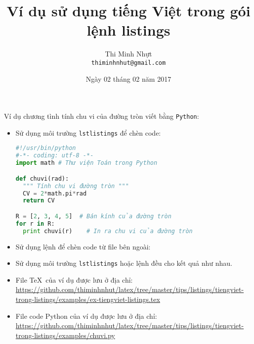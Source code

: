 \documentclass[12pt, a4paper]{article}
\title{\bfseries Ví dụ sử dụng tiếng Việt trong gói lệnh listings}
\author{Thi Minh Nhựt \bigskip \\ \tt{thiminhnhut@gmail.com}}
\date{Ngày 02 tháng 02 năm 2017}
\begin{document}
\maketitle

Ví dụ chương tình tính chu vi của đường tròn viết bằng \verb|Python|:
\begin{itemize}
  \item Sử dụng môi trường \verb|lstlistings| để chèn code:
        \begin{lstlisting}[language=Python]
#!/usr/bin/python
#-*- coding: utf-8 -*-
import math # Thư viện Toán trong Python

def chuvi(rad):
  """ Tính chu vi đường tròn """
  CV = 2*math.pi*rad
  return CV

R = [2, 3, 4, 5]  # Bán kính của đường tròn
for r in R:
  print chuvi(r)	# In ra chu vi của đường tròn
\end{lstlisting}

  \item Sử dụng lệnh \verb|| để chèn code từ file bên ngoài: 

  \item Sử dụng môi trường \verb|lstlistings| hoặc lệnh \verb|| đều cho kết quả như nhau.

  \item File \TeX\ của ví dụ được lưu ở địa chỉ: \url{https://github.com/thiminhnhut/latex/tree/master/tips/listings/tiengviet-trong-listings/examples/ex-tiengviet-listings.tex}

  \item File code Python của ví dụ được lưu ở địa chỉ: \url{https://github.com/thiminhnhut/latex/tree/master/tips/listings/tiengviet-trong-listings/examples/chuvi.py}
\end{itemize}
\end{document}
